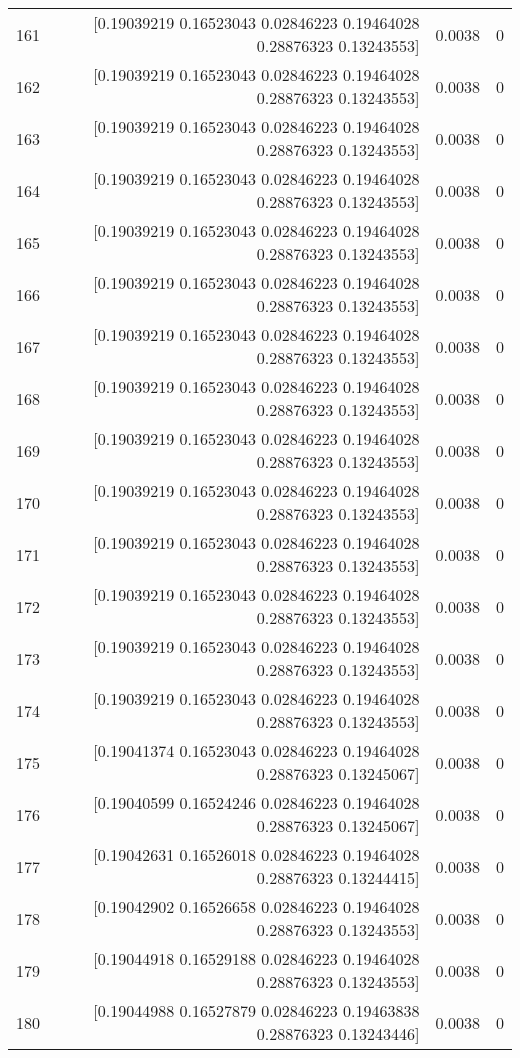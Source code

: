 \begin{longtable}{lrrr}
161 & [0.19039219 0.16523043 0.02846223 0.19464028 0.28876323 0.13243553] & 0.0038 & 0 \\
162 & [0.19039219 0.16523043 0.02846223 0.19464028 0.28876323 0.13243553] & 0.0038 & 0 \\
163 & [0.19039219 0.16523043 0.02846223 0.19464028 0.28876323 0.13243553] & 0.0038 & 0 \\
164 & [0.19039219 0.16523043 0.02846223 0.19464028 0.28876323 0.13243553] & 0.0038 & 0 \\
165 & [0.19039219 0.16523043 0.02846223 0.19464028 0.28876323 0.13243553] & 0.0038 & 0 \\
166 & [0.19039219 0.16523043 0.02846223 0.19464028 0.28876323 0.13243553] & 0.0038 & 0 \\
167 & [0.19039219 0.16523043 0.02846223 0.19464028 0.28876323 0.13243553] & 0.0038 & 0 \\
168 & [0.19039219 0.16523043 0.02846223 0.19464028 0.28876323 0.13243553] & 0.0038 & 0 \\
169 & [0.19039219 0.16523043 0.02846223 0.19464028 0.28876323 0.13243553] & 0.0038 & 0 \\
170 & [0.19039219 0.16523043 0.02846223 0.19464028 0.28876323 0.13243553] & 0.0038 & 0 \\
171 & [0.19039219 0.16523043 0.02846223 0.19464028 0.28876323 0.13243553] & 0.0038 & 0 \\
172 & [0.19039219 0.16523043 0.02846223 0.19464028 0.28876323 0.13243553] & 0.0038 & 0 \\
173 & [0.19039219 0.16523043 0.02846223 0.19464028 0.28876323 0.13243553] & 0.0038 & 0 \\
174 & [0.19039219 0.16523043 0.02846223 0.19464028 0.28876323 0.13243553] & 0.0038 & 0 \\
175 & [0.19041374 0.16523043 0.02846223 0.19464028 0.28876323 0.13245067] & 0.0038 & 0 \\
176 & [0.19040599 0.16524246 0.02846223 0.19464028 0.28876323 0.13245067] & 0.0038 & 0 \\
177 & [0.19042631 0.16526018 0.02846223 0.19464028 0.28876323 0.13244415] & 0.0038 & 0 \\
178 & [0.19042902 0.16526658 0.02846223 0.19464028 0.28876323 0.13243553] & 0.0038 & 0 \\
179 & [0.19044918 0.16529188 0.02846223 0.19464028 0.28876323 0.13243553] & 0.0038 & 0 \\
180 & [0.19044988 0.16527879 0.02846223 0.19463838 0.28876323 0.13243446] & 0.0038 & 0 \\

\end{longtable}
